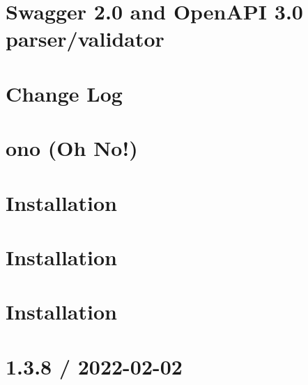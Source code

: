 \documentclass[twoside]{book}
\newcommand{\+}{\discretionary{\mbox{\scriptsize$\hookleftarrow$}}{}{}}
\begin{document}
\chapter{Swagger 2.0 and Open\+API 3.0 parser/validator}
\label{md_Backend_nodejs_node_modules__apidevtools_swagger_parser_README}

\chapter{Change Log}
\label{md_Backend_nodejs_node_modules__jsdevtools_ono_CHANGELOG}

\chapter{ono (Oh No!)}
\label{md_Backend_nodejs_node_modules__jsdevtools_ono_README}

\chapter{Installation}
\label{md_Backend_nodejs_node_modules__types_geojson_README}

\chapter{Installation}
\label{md_Backend_nodejs_node_modules__types_json_schema_README}

\chapter{Installation}
\label{md_Backend_nodejs_node_modules__types_node_README}

\chapter{1.3.8 / 2022-\/02-\/02}
\label{md_Backend_nodejs_node_modules_accepts_HISTORY}

\end{document}

